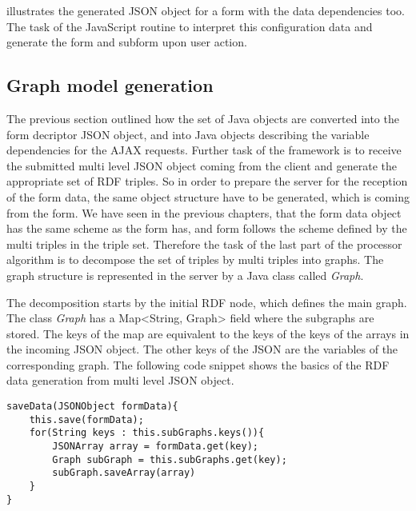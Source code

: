  illustrates the generated JSON object for a form with the data dependencies too. The task of the JavaScript routine to interpret this configuration data and generate the form and subform upon user action.


\subsection{Graph model generation}  \label{513}

The previous section outlined how the set of Java objects are converted into the form decriptor JSON object, and into Java objects describing the variable dependencies for the AJAX requests. Further task of the framework is to receive the submitted multi level JSON object coming from the client and generate the appropriate set of RDF triples. So in order to prepare the server for the reception of the form data, the same object structure have to be generated, which is coming from the form. We have seen in the previous chapters, that the form data object has the same scheme as the form has, and form follows the scheme defined by the multi triples in the triple set. Therefore the task of the last part of the processor algorithm is to decompose the set of triples by multi triples into graphs. The graph structure is represented in the server by a Java class called \textit{Graph}. 


The decomposition starts by the initial RDF node, which defines the main graph. The class \textit{Graph} has a Map<String, Graph> field where the subgraphs are stored. The keys of the map are equivalent to the keys of the keys of the arrays in the incoming JSON object. The other keys of the JSON are the variables of the corresponding graph. The following code snippet shows the basics of the RDF data generation from multi level JSON object. 

\begin{lstlisting}[basicstyle=\footnotesize, frame=single, caption={Subform descriptor}, label=dataGeneration captionpos=b, belowskip=1em, aboveskip=2em]
saveData(JSONObject formData){
	this.save(formData);
	for(String keys : this.subGraphs.keys()){
		JSONArray array = formData.get(key);
		Graph subGraph = this.subGraphs.get(key);
		subGraph.saveArray(array)					
	}
}
\end{lstlisting}


